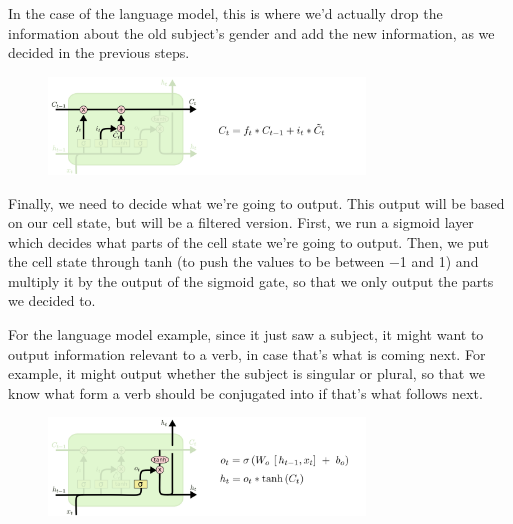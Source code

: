 In the case of the language model, this is where we’d actually drop the information about the old subject’s gender and add the new information, as we decided in the previous steps.

\begin{figure}[htbp]
	\centering
	\includegraphics[width=0.75\textwidth]{fig/11.png}
\end{figure}

Finally, we need to decide what we’re going to output. This output will be based on our cell state, but will be a filtered version. First, we run a sigmoid layer which decides what parts of the cell state we’re going to output. Then, we put the cell state through tanh (to push the values to be between −1 and 1) and multiply it by the output of the sigmoid gate, so that we only output the parts we decided to.

For the language model example, since it just saw a subject, it might want to output information relevant to a verb, in case that’s what is coming next. For example, it might output whether the subject is singular or plural, so that we know what form a verb should be conjugated into if that’s what follows next.

\begin{figure}[htbp]
	\centering
	\includegraphics[width=0.75\textwidth]{fig/112.png}
\end{figure}